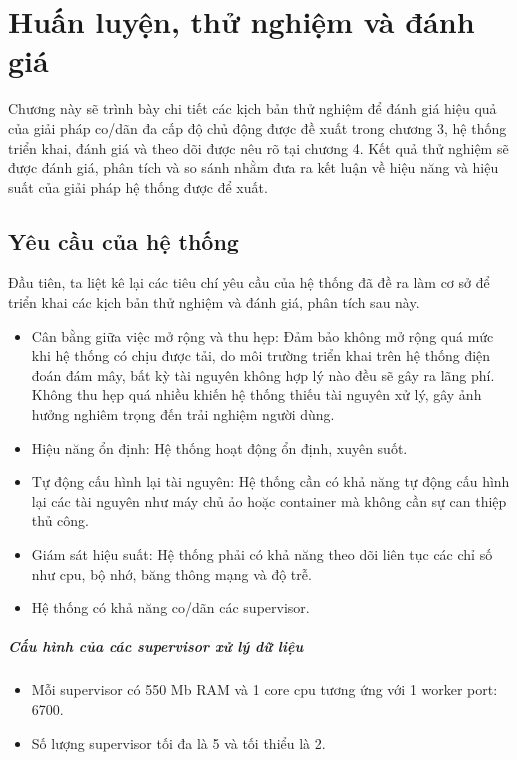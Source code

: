 \chapter{Huấn luyện, thử nghiệm và đánh giá}

Chương này sẽ trình bày chi tiết các kịch bản thử nghiệm để đánh giá hiệu quả của giải pháp co/dãn đa cấp độ chủ động được đề xuất trong chương 3, hệ thống triển khai, đánh giá và theo dõi được nêu rõ tại chương 4. Kết quả thử nghiệm sẽ được đánh giá, phân tích và so sánh nhằm đưa ra kết luận về hiệu năng và hiệu suất của giải pháp hệ thống được để xuất.

\section{Yêu cầu của hệ thống}

Đầu tiên, ta liệt kê lại các tiêu chí yêu cầu của hệ thống đã đề ra làm cơ sở để triển khai các kịch bản thử nghiệm và đánh giá, phân tích sau này.

\begin{itemize}
    \item Cân bằng giữa việc mở rộng và thu hẹp: Đảm bảo không mở rộng quá mức khi hệ thống có chịu được tải, do môi trường triển khai trên hệ thống điện đoán đám mây, bất kỳ tài nguyên không hợp lý nào đều sẽ gây ra lãng phí. Không thu hẹp quá nhiều khiến hệ thống thiếu tài nguyên xử lý, gây ảnh hưởng nghiêm trọng đến trải nghiệm người dùng.
    \item Hiệu năng ổn định: Hệ thống hoạt động ổn định, xuyên suốt.
    \item Tự động cấu hình lại tài nguyên: Hệ thống cần có khả năng tự động cấu hình lại các tài nguyên như máy chủ ảo hoặc container mà không cần sự can thiệp thủ công.
    \item Giám sát hiệu suất: Hệ thống phải có khả năng theo dõi liên tục các chỉ số như \gls{cpu}, bộ nhớ, băng thông mạng và độ trễ.
    \item Hệ thống có khả năng co/dãn các supervisor.
\end{itemize}

\paragraph{Cấu hình của các supervisor xử lý dữ liệu}

\begin{itemize}
    \item Mỗi supervisor có 550 Mb RAM và 1 core \gls{cpu} tương ứng với 1 worker port: 6700.
    \item Số lượng supervisor tối đa là 5 và tối thiểu là 2.
\end{itemize}

